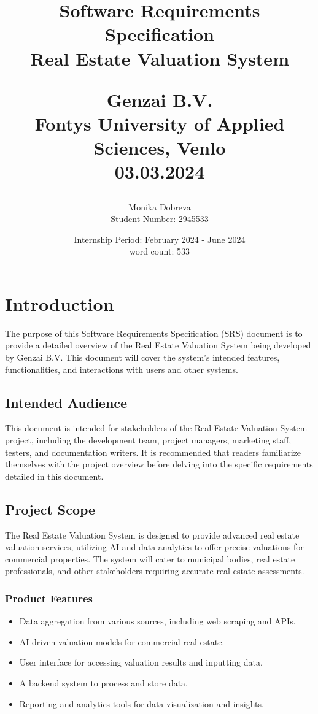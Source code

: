 \documentclass[12pt]{article}
\title{
    Software Requirements Specification \\ Real Estate Valuation System\\[1ex] %
    \author{Monika Dobreva\\Student Number: 2945533}
    \date{Internship Period: February 2024 - June 2024 \\ \small word count: 533 \\} 
    \large Genzai B.V.\\ %
    \large Fontys University of Applied Sciences, Venlo\\03.03.2024 %
}
\begin{document}
\setcounter{page}{1}

\maketitle
\thispagestyle{empty}
\newpage 
\tableofcontents
\newpage

\section{Introduction}
\setcounter{page}{1}
The purpose of this Software Requirements Specification (SRS) document is to provide a detailed overview of the Real Estate Valuation System being developed by Genzai B.V. This document will cover the system's intended features, functionalities, and interactions with users and other systems.

\subsection{Intended Audience}
This document is intended for stakeholders of the Real Estate Valuation System project, including the development team, project managers, marketing staff, testers, and documentation writers. It is recommended that readers familiarize themselves with the project overview before delving into the specific requirements detailed in this document.

\subsection{Project Scope}
The Real Estate Valuation System is designed to provide advanced real estate valuation services, utilizing AI and data analytics to offer precise valuations for commercial properties. The system will cater to municipal bodies, real estate professionals, and other stakeholders requiring accurate real estate assessments.

\subsubsection{Product Features}
\begin{itemize}
    \item Data aggregation from various sources, including web scraping and APIs.
    \item AI-driven valuation models for commercial real estate.
    \item User interface for accessing valuation results and inputting data.
    \item A backend system to process and store data.
    \item Reporting and analytics tools for data visualization and insights.
\end{itemize}
\end{document}
